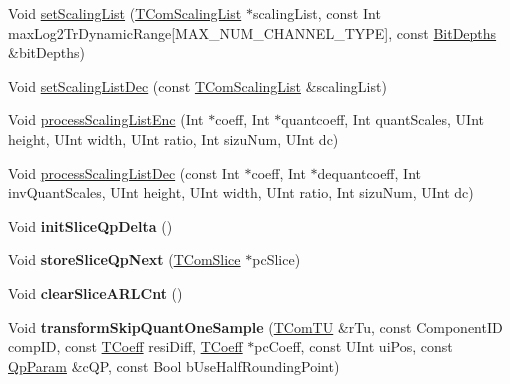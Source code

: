 \begin{DoxyCompactItemize}
\item 
Void \hyperlink{class_t_com_tr_quant_aed9e2ba6bde5cd40f6190fc0bcd71322}{set\+Scaling\+List} (\hyperlink{class_t_com_scaling_list}{T\+Com\+Scaling\+List} $\ast$scaling\+List, const Int max\+Log2\+Tr\+Dynamic\+Range\mbox{[}M\+A\+X\+\_\+\+N\+U\+M\+\_\+\+C\+H\+A\+N\+N\+E\+L\+\_\+\+T\+Y\+PE\mbox{]}, const \hyperlink{struct_bit_depths}{Bit\+Depths} \&bit\+Depths)
\item 
Void \hyperlink{class_t_com_tr_quant_a06d626b693c554131753a3e632b2cdba}{set\+Scaling\+List\+Dec} (const \hyperlink{class_t_com_scaling_list}{T\+Com\+Scaling\+List} \&scaling\+List)
\item 
Void \hyperlink{class_t_com_tr_quant_abbafcefed9e54ca6236a8d24540ebeec}{process\+Scaling\+List\+Enc} (Int $\ast$coeff, Int $\ast$quantcoeff, Int quant\+Scales, U\+Int height, U\+Int width, U\+Int ratio, Int sizu\+Num, U\+Int dc)
\item 
Void \hyperlink{class_t_com_tr_quant_a660cb31f22773b50f551682135e3f70d}{process\+Scaling\+List\+Dec} (const Int $\ast$coeff, Int $\ast$dequantcoeff, Int inv\+Quant\+Scales, U\+Int height, U\+Int width, U\+Int ratio, Int sizu\+Num, U\+Int dc)
\item 
\mbox{\label{class_t_com_tr_quant_a06354de4de2d3d787bd07b6fc433e07d}} 
Void {\bfseries init\+Slice\+Qp\+Delta} ()
\item 
\mbox{\label{class_t_com_tr_quant_aab0b6e2b303d1bb866e3300baf6118d0}} 
Void {\bfseries store\+Slice\+Qp\+Next} (\hyperlink{class_t_com_slice}{T\+Com\+Slice} $\ast$pc\+Slice)
\item 
\mbox{\label{class_t_com_tr_quant_ae9956822f5f7a04a0cdb6709f5b729eb}} 
Void {\bfseries clear\+Slice\+A\+R\+L\+Cnt} ()
\item 
\mbox{\label{class_t_com_tr_quant_ae8091e2577c812c8dd5f223d3c83365a}} 
Void {\bfseries transform\+Skip\+Quant\+One\+Sample} (\hyperlink{class_t_com_t_u}{T\+Com\+TU} \&r\+Tu, const Component\+ID comp\+ID, const \hyperlink{_type_def_8h_a5bdd3b17d14ed1978c366d2d958c0300}{T\+Coeff} resi\+Diff, \hyperlink{_type_def_8h_a5bdd3b17d14ed1978c366d2d958c0300}{T\+Coeff} $\ast$pc\+Coeff, const U\+Int ui\+Pos, const \hyperlink{struct_qp_param}{Qp\+Param} \&c\+QP, const Bool b\+Use\+Half\+Rounding\+Point)
\item 

\end{DoxyCompactItemize}
